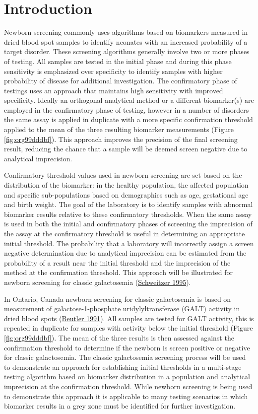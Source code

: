 \documentclass[review]{elsarticle}
\begin{document}
\section*{Introduction}
\label{sec:orgd29a6d7}
Newborn screening commonly uses algorithms based on biomarkers
measured in dried blood spot samples to identify neonates with an
increased probability of a target disorder. These screening algorithms
generally involve two or more phases of testing. All samples are
tested in the initial phase and during this phase sensitivity is
emphasized over specificity to identify samples with higher
probability of disease for additional investigation. The confirmatory
phase of testings uses an approach that maintains high sensitivity
with improved specificity. Ideally an orthogonal analytical method or
a different biomarker(s) are employed in the confirmatory phase of
testing, however in a number of disorders the same assay is applied in
duplicate with a more specific confirmation threshold applied to the
mean of the three resulting biomarker measurements (Figure
\ref{fig:org99dddbf}). This approach improves the precision of the final
screening result, reducing the chance that a sample will be deemed
screen negative due to analytical imprecision.

Confirmatory threshold values used in newborn screening are set based
on the distribution of the biomarker: in the healthy population, the
affected population and specific sub-populations based on demographics
such as age, gestational age and birth weight. The goal of the
laboratory is to identify samples with abnormal biomarker results
relative to these confirmatory thresholds. When the same assay is used
in both the initial and confirmatory phases of screening the
imprecision of the assay at the confirmatory threshold is useful in
determining an appropriate initial threshold. The probability that a
laboratory will incorrectly assign a screen negative determination due
to analytical imprecision can be estimated from the probability of a
result near the initial threshold and the imprecision of the method at
the confirmation threshold. This approach will be illustrated for
newborn screening for classic galactosemia (\hyperlink{citeproc_bib_item_9}{Schweitzer 1995}).

In Ontario, Canada newborn screening for classic galactosemia is based
on measurement of galactose-1-phosphate uridylyltransferase (GALT)
activity in dried blood spots (\hyperlink{citeproc_bib_item_1}{Beutler 1991}). All samples are
tested for GALT activity, this is repeated in duplicate for samples
with activity below the initial threshold (Figure \ref{fig:org99dddbf}). The
mean of the three results is then assessed against the confirmation
threshold to determine if the newborn is screen positive or negative
for classic galactosemia. The classic galactosemia screening process
will be used to demonstrate an approach for establishing initial
thresholds in a multi-stage testing algorithm based on biomarker
distribution in a population and analytical imprecision at the
confirmation threshold. While newborn screening is being used to
demonstrate this approach it is applicable to many testing scenarios
in which biomarker results in a grey zone must be identified for
further investigation.
\end{document}
